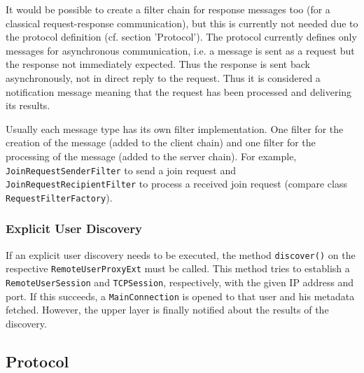 It would be possible to create a filter chain for response messages too (for a classical request-response communication), but this is currently not needed due to the protocol definition (cf. section 'Protocol'). The protocol currently defines only messages for asynchronous communication, i.e. a message is sent as a request but the response not immediately expected. Thus the response is sent back asynchronously, not in direct reply to the request. Thus it is considered a notification message meaning that the request has been processed and delivering its results.

Usually each message type has its own filter implementation. One filter for the creation of the message (added to the client chain) and one filter for the processing of the message (added to the server chain). For example, \texttt{JoinRequestSenderFilter} to send a join request and \texttt{JoinRequestRecipientFilter} to process a received join request (compare class \texttt{RequestFilterFactory}).


\subsubsection{Explicit User Discovery}
\label{chapter:network.protocol.explicituserdiscovery}
If an explicit user discovery needs to be executed, the method \texttt{discover()} on the respective \texttt{RemoteUserProxyExt} must be called. This method tries to establish a \texttt{RemoteUserSession} and \texttt{TCPSession}, respectively, with the given IP address and port. If this succeeds, a \texttt{MainConnection} is opened to that user and his metadata fetched. However, the upper layer is finally notified about the results of the discovery.



\subsection{Protocol}
\label{chapter:network.communication.protocol}
